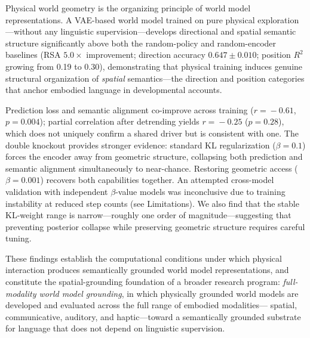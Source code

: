 \documentclass{article}
\begin{document}
Physical world geometry is the organizing principle of world model representations.
A VAE-based world model trained on pure physical exploration---without any linguistic
supervision---develops directional and spatial semantic structure significantly above
both the random-policy and random-encoder baselines
(RSA $5.0\times$ improvement; direction accuracy $0.647\!\pm\!0.010$;
position $R^2$ growing from 0.19 to 0.30),
demonstrating that physical training induces genuine structural organization
of \emph{spatial} semantics---the direction and position categories
that anchor embodied language in developmental accounts.

Prediction loss and semantic alignment co-improve across training
($r\!=\!-0.61$, $p\!=\!0.004$); partial correlation after detrending
yields $r\!=\!-0.25$ ($p\!=\!0.28$), which does not uniquely confirm
a shared driver but is consistent with one.
The double knockout provides stronger evidence: standard KL regularization ($\beta\!=\!0.1$)
forces the encoder away from geometric structure, collapsing both prediction
and semantic alignment simultaneously to near-chance.
Restoring geometric access ($\beta\!=\!0.001$) recovers both capabilities together.
An attempted cross-model validation with independent $\beta$-value models
was inconclusive due to training instability at reduced step counts
(see Limitations).
We also find that the stable KL-weight range is narrow---roughly one
order of magnitude---suggesting that preventing posterior collapse while
preserving geometric structure requires careful tuning.

These findings establish the computational conditions under which physical
interaction produces semantically grounded world model representations,
and constitute the spatial-grounding foundation of a broader research program:
\emph{full-modality world model grounding}, in which physically grounded
world models are developed and evaluated across the full range of embodied modalities---
spatial, communicative, auditory, and haptic---toward a semantically grounded
substrate for language that does not depend on linguistic supervision.



\end{document}
